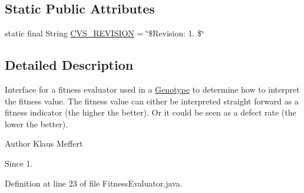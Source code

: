 \subsection*{Static Public Attributes}
\begin{DoxyCompactItemize}
\item 
static final String \hyperlink{interfaceorg_1_1jgap_1_1_fitness_evaluator_a32a4b647d27c9df5261b4efb0e7a8452}{C\-V\-S\-\_\-\-R\-E\-V\-I\-S\-I\-O\-N} = \char`\"{}\$Revision\-: 1. \$\char`\"{}
\end{DoxyCompactItemize}


\subsection{Detailed Description}
Interface for a fitness evaluator used in a \hyperlink{classorg_1_1jgap_1_1_genotype}{Genotype} to determine how to interpret the fitness value. The fitness value can either be interpreted straight forward as a fitness indicator (the higher the better). Or it could be seen as a defect rate (the lower the better).

\begin{DoxyAuthor}{Author}
Klaus Meffert 
\end{DoxyAuthor}
\begin{DoxySince}{Since}
1. 
\end{DoxySince}


Definition at line 23 of file Fitness\-Evaluator.\-java.



